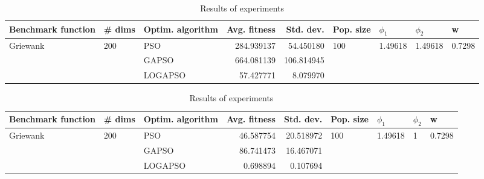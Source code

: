 \documentclass{article}
\begin{document}
\begin{table}
\centering
\caption{Results of experiments}
\begin{tabular}{lllrrllll}
\toprule
       Benchmark function &              \# dims & Optim. algorithm &  Avg. fitness &  Std. dev. &            Pop. size &               $\phi_{1}$ &               $\phi_{2}$ &                       w \\
\midrule
\multirow{3}{*}{Griewank} & \multirow{3}{*}{200} &              PSO &    284.939137 &  54.450180 & \multirow{3}{*}{100} & \multirow{3}{*}{1.49618} & \multirow{3}{*}{1.49618} & \multirow{3}{*}{0.7298} \\
                          &                      &            GAPSO &    664.081139 & 106.814945 &                      &                          &                          &                         \\
                          &                      &          LOGAPSO &     57.427771 &   8.079970 &                      &                          &                          &                         \\
\bottomrule
\end{tabular}
\end{table}
\begin{table}
\centering
\caption{Results of experiments}
\begin{tabular}{lllrrllll}
\toprule
       Benchmark function &              \# dims & Optim. algorithm &  Avg. fitness &  Std. dev. &            Pop. size &               $\phi_{1}$ &         $\phi_{2}$ &                       w \\
\midrule
\multirow{3}{*}{Griewank} & \multirow{3}{*}{200} &              PSO &     46.587754 &  20.518972 & \multirow{3}{*}{100} & \multirow{3}{*}{1.49618} & \multirow{3}{*}{1} & \multirow{3}{*}{0.7298} \\
                          &                      &            GAPSO &     86.741473 &  16.467071 &                      &                          &                    &                         \\
                          &                      &          LOGAPSO &      0.698894 &   0.107694 &                      &                          &                    &                         \\
\bottomrule
\end{tabular}
\end{table}
\end{document}
